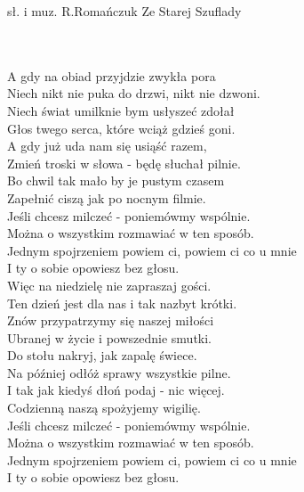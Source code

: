 {sł. i muz. R.Romańczuk}
{Ze Starej Szuflady}
\begin{text}
\vin\\
\vin\\
A gdy na obiad przyjdzie zwykła pora\\
Niech nikt nie puka do drzwi, nikt nie dzwoni.\\
Niech świat umilknie bym usłyszeć zdołał\\
Głos twego serca, które wciąż gdzieś goni.\\

A gdy już uda nam się usiąść razem,\\
Zmień troski w słowa - będę słuchał pilnie.\\
Bo chwil tak mało by je pustym czasem\\
Zapełnić ciszą jak po nocnym filmie.\\

\vin Jeśli chcesz milczeć - poniemówmy wspólnie.\\
\vin Można o wszystkim rozmawiać w ten sposób.\\
\vin Jednym spojrzeniem powiem ci, powiem ci co u mnie\\
\vin I ty o sobie opowiesz bez głosu.\\

Więc na niedzielę nie zapraszaj gości.\\
Ten dzień jest dla nas i tak nazbyt krótki.\\
Znów przypatrzymy się naszej miłości\\
Ubranej w życie i powszednie smutki.\\

Do stołu nakryj, jak zapalę świece.\\
Na później odłóż sprawy wszystkie pilne.\\
I tak jak kiedyś dłoń podaj - nic więcej.\\
Codzienną naszą spożyjemy wigilię.\\

\vin Jeśli chcesz milczeć - poniemówmy wspólnie.\\
\vin Można o wszystkim rozmawiać w ten sposób.\\
\vin Jednym spojrzeniem powiem ci, powiem ci co u mnie\\
\vin I ty o sobie opowiesz bez głosu.\\

\end{text}

